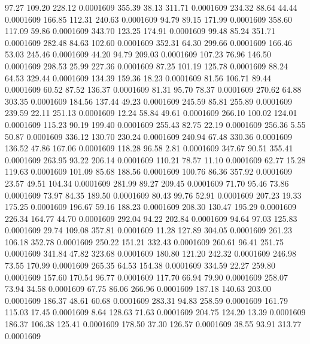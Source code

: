  97.27  109.20  228.12   0.0001609
 355.39   38.13  311.71   0.0001609
 234.32   88.64   44.44   0.0001609
 166.85  112.31  240.63   0.0001609
  94.79   89.15  171.99   0.0001609
 358.60  117.09   59.86   0.0001609
 343.70  123.25  174.91   0.0001609
  99.48   85.24  351.71   0.0001609
 282.48   84.63  102.60   0.0001609
 352.31   64.30  299.66   0.0001609
 166.46   53.03  245.46   0.0001609
  44.20   94.79  209.03   0.0001609
 107.23   76.96  146.50   0.0001609
 298.53   25.99  227.36   0.0001609
  87.25  101.19  125.78   0.0001609
  88.24   64.53  329.44   0.0001609
 134.39  159.36   18.23   0.0001609
  81.56  106.71   89.44   0.0001609
  60.52   87.52  136.37   0.0001609
  81.31   95.70   78.37   0.0001609
 270.62   64.88  303.35   0.0001609
 184.56  137.44   49.23   0.0001609
 245.59   85.81  255.89   0.0001609
 239.59   22.11  251.13   0.0001609
  12.24   58.84   49.61   0.0001609
 266.10  100.02  124.01   0.0001609
 115.23   90.19  199.40   0.0001609
 255.43   82.75   22.19   0.0001609
 256.36    5.55   50.87   0.0001609
 336.12  130.70  230.24   0.0001609
 240.94   67.48  330.36   0.0001609
 136.52   47.86  167.06   0.0001609
 118.28   96.58    2.81   0.0001609
 347.67   90.51  355.41   0.0001609
 263.95   93.22  206.14   0.0001609
 110.21   78.57   11.10   0.0001609
  62.77   15.28  119.63   0.0001609
 101.09   85.68  188.56   0.0001609
 100.76   86.36  357.92   0.0001609
  23.57   49.51  104.34   0.0001609
 281.99   89.27  209.45   0.0001609
  71.70   95.46   73.86   0.0001609
  73.97   84.35  189.50   0.0001609
  80.43   99.76   52.91   0.0001609
 207.23   19.33  175.25   0.0001609
 196.67   59.16  188.23   0.0001609
 208.30  130.47  195.29   0.0001609
 226.34  164.77   44.70   0.0001609
 292.04   94.22  202.84   0.0001609
  94.64   97.03  125.83   0.0001609
  29.74  109.08  357.81   0.0001609
  11.28  127.89  304.05   0.0001609
 261.23  106.18  352.78   0.0001609
 250.22  151.21  332.43   0.0001609
 260.61   96.41  251.75   0.0001609
 341.84   47.82  323.68   0.0001609
 180.80  121.20  242.32   0.0001609
 246.98   73.55  170.99   0.0001609
 265.35   64.53  154.38   0.0001609
 334.59   22.27  259.80   0.0001609
 157.60  170.54   96.77   0.0001609
 117.70   66.94   79.90   0.0001609
 258.07   73.94   34.58   0.0001609
  67.75   86.06  266.96   0.0001609
 187.18  140.63  203.00   0.0001609
 186.37   48.61   60.68   0.0001609
 283.31   94.83  258.59   0.0001609
 161.79  115.03   17.45   0.0001609
   8.64  128.63   71.63   0.0001609
 204.75  124.20   13.39   0.0001609
 186.37  106.38  125.41   0.0001609
 178.50   37.30  126.57   0.0001609
  38.55   93.91  313.77   0.0001609
